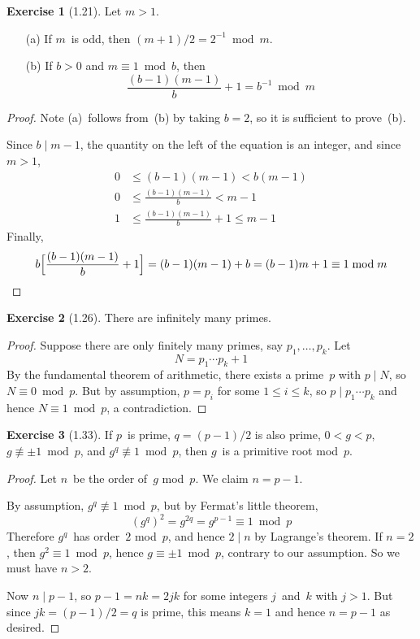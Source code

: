 \documentclass[letterpaper,12pt]{article}
\newcommand{\divides}{\mathrel{|}}
\theoremstyle{definition}
\newtheorem*{exer}{Exercise}
\begin{document}
\begin{exer}[1.21]
Let \(m>1\).
\begin{enumerate}[itemsep=0pt]
\item[(a)] If \(m\)~is odd, then \((m+1)/2=2^{-1}\bmod m\).
\item[(b)] If \(b>0\) and \(m\equiv 1\bmod b\), then
\[\frac{(b-1)(m-1)}{b}+1=b^{-1}\bmod m\]
\end{enumerate}
\end{exer}
\begin{proof}
Note (a)~follows from~(b) by taking \(b=2\), so it is sufficient to prove~(b).

Since \(b\divides m-1\), the quantity on the left of the equation is an integer, and since \(m>1\),
\begin{align*}
0&\le (b-1)(m-1)<b(m-1)\\
0&\le\frac{(b-1)(m-1)}{b}<m-1\\
1&\le\frac{(b-1)(m-1)}{b}+1\le m-1
\end{align*}
Finally,
\[b\Bigl[\frac{(b-1)(m-1)}{b}+1\Bigr]=(b-1)(m-1)+b=(b-1)m+1\equiv 1\bmod m\qedhere\]
\end{proof}

\begin{exer}[1.26]
There are infinitely many primes.
\end{exer}
\begin{proof}
Suppose there are only finitely many primes, say \(p_1,\ldots,p_k\). Let
\[N=p_1\cdots p_k+1\]
By the fundamental theorem of arithmetic, there exists a prime~\(p\) with \(p\divides N\), so \(N\equiv 0\bmod p\). But by assumption, \(p=p_i\) for some \(1\le i\le k\), so \(p\divides p_1\cdots p_k\) and hence \(N\equiv 1\bmod p\), a contradiction.
\end{proof}

\begin{exer}[1.33]
If \(p\)~is prime, \(q=(p-1)/2\) is also prime, \(0<g<p\), \(g\not\equiv\pm 1\bmod p\), and \(g^q\not\equiv 1\bmod p\), then \(g\)~is a primitive root mod~\(p\).
\end{exer}
\begin{proof}
Let \(n\)~be the order of~\(g\) mod~\(p\). We claim \(n=p-1\).

By assumption, \(g^q\not\equiv 1\bmod p\), but by Fermat's little theorem,
\[(g^q)^2=g^{2q}=g^{p-1}\equiv 1\bmod p\]
Therefore \(g^q\)~has order~\(2\) mod~\(p\), and hence \(2\divides n\) by Lagrange's theorem. If \(n=2\), then \(g^2\equiv 1\bmod p\), hence \(g\equiv\pm 1\bmod p\), contrary to our assumption. So we must have \(n>2\).

Now \(n\divides p-1\), so \(p-1=nk=2jk\) for some integers \(j\)~and~\(k\) with \(j>1\). But since \(jk=(p-1)/2=q\) is prime, this means \(k=1\) and hence \(n=p-1\) as desired.
\end{proof}
\end{document}
